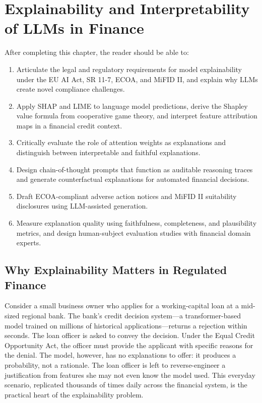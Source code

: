 \chapter{Explainability and Interpretability of LLMs in Finance}
\label{ch:xai-explainability}

\begin{remark}
After completing this chapter, the reader should be able to:
\begin{enumerate}
  \item Articulate the legal and regulatory requirements for model explainability under
        the EU AI Act, SR 11-7, ECOA, and MiFID II, and explain why LLMs create novel
        compliance challenges.
  \item Apply SHAP and LIME to language model predictions, derive the Shapley value
        formula from cooperative game theory, and interpret feature attribution maps in a
        financial credit context.
  \item Critically evaluate the role of attention weights as explanations and distinguish
        between interpretable and faithful explanations.
  \item Design chain-of-thought prompts that function as auditable reasoning traces and
        generate counterfactual explanations for automated financial decisions.
  \item Draft ECOA-compliant adverse action notices and MiFID II suitability disclosures
        using LLM-assisted generation.
  \item Measure explanation quality using faithfulness, completeness, and plausibility
        metrics, and design human-subject evaluation studies with financial domain experts.
\end{enumerate}
\end{remark}

\section{Why Explainability Matters in Regulated Finance}
\label{sec:ch12-why-explainability}

\begin{context}
Consider a small business owner who applies for a working-capital loan at a mid-sized
regional bank. The bank's credit decision system---a transformer-based model trained on
millions of historical applications---returns a rejection within seconds. The loan officer
is asked to convey the decision. Under the Equal Credit Opportunity Act, the officer
must provide the applicant with specific reasons for the denial. The model, however, has
no explanations to offer: it produces a probability, not a rationale. The loan officer is
left to reverse-engineer a justification from features she may not even know the model
used. This everyday scenario, replicated thousands of times daily across the financial
system, is the practical heart of the explainability problem.
\end{context}

